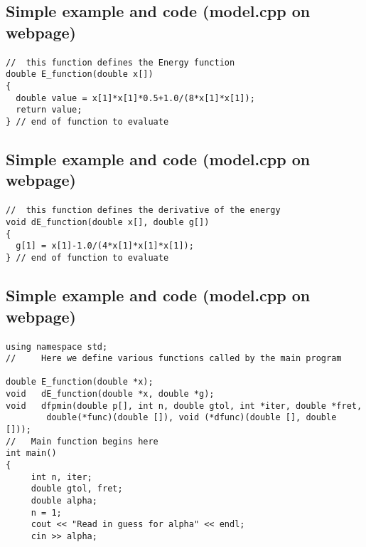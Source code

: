 \documentclass[%
twoside,                 %
final,                   %
10pt]{article}
\begin{document}
\subsection*{Simple example and code (model.cpp on webpage)}

\paragraph{}
\begin{verbatim}
//  this function defines the Energy function
double E_function(double x[])
{
  double value = x[1]*x[1]*0.5+1.0/(8*x[1]*x[1]);
  return value;
} // end of function to evaluate
\end{verbatim}



\subsection*{Simple example and code (model.cpp on webpage)}

\paragraph{}
\begin{verbatim}
//  this function defines the derivative of the energy 
void dE_function(double x[], double g[])
{
  g[1] = x[1]-1.0/(4*x[1]*x[1]*x[1]);
} // end of function to evaluate
\end{verbatim}



\subsection*{Simple example and code (model.cpp on webpage)}

\paragraph{}
\begin{verbatim}
using namespace std;
//     Here we define various functions called by the main program

double E_function(double *x);
void   dE_function(double *x, double *g);
void   dfpmin(double p[], int n, double gtol, int *iter, double *fret,
	    double(*func)(double []), void (*dfunc)(double [], double []));
//   Main function begins here
int main()
{
     int n, iter;
     double gtol, fret;
     double alpha;
     n = 1;
     cout << "Read in guess for alpha" << endl;
     cin >> alpha;
\end{verbatim}
\end{document}
